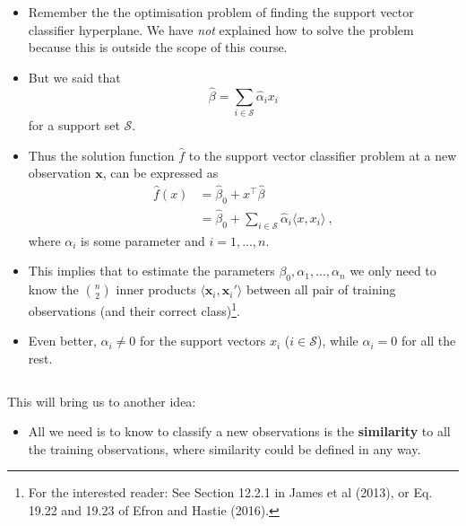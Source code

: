 \documentclass[10pt,ignorenonframetext,]{beamer}
\providecommand{\tightlist}{%
  \setlength{\itemsep}{0pt}\setlength{\parskip}{0pt}}
\begin{document}
\begin{frame}

\begin{itemize}
\item
  Remember the the optimisation problem of finding the support vector
  classifier hyperplane. We have \emph{not} explained how to solve the
  problem because this is outside the scope of this course. \vspace{1mm}
\item
  But we said that
  \[\hat{\beta}= \sum_{i\in \mathcal{S}} \hat\alpha_i x_i \] for a
  support set \(\mathcal{S}\). \vspace{1mm}
\end{itemize}

\begin{itemize}
\tightlist
\item
  Thus the solution function \(\hat{f}\) to the support vector
  classifier problem at a new observation \({\boldsymbol x}\), can be
  expressed as \begin{align*}
  \hat{f}(x) & = \hat{\beta}_0 + x^\top \hat\beta  \\
   & = \hat\beta_0 + \sum_{i \in \mathcal{S}} \hat\alpha_i \langle x,x_i \rangle \ ,
  \end{align*} where \(\alpha_i\) is some parameter and \(i=1,...,n\).
\end{itemize}

\end{frame}

\begin{frame}

\begin{itemize}
\item
  This implies that to estimate the parameters
  \(\beta_0,\alpha_1,...,\alpha_n\) we only need to know the
  \({n \choose 2}\) inner products
  \(\langle {\boldsymbol x}_i,{\boldsymbol x}_i' \rangle\) between all
  pair of training observations (and their correct
  class)\footnote{For the interested reader: See Section 12.2.1 in James et al (2013), or Eq. 19.22 and 19.23 of Efron and Hastie (2016).}.
\item
  Even better, \(\alpha_i \neq 0\) for the support vectors \(x_i\)
  (\(i \in \mathcal{S}\)), while \(\alpha_i=0\) for all the rest.
\end{itemize}

\(~\)

This will bring us to another idea:

\begin{itemize}
\tightlist
\item
  All we need is to know to classify a new observations is the
  \textbf{similarity} to all the training observations, where similarity
  could be defined in any way.
\end{itemize}

\end{frame}
\end{document}
